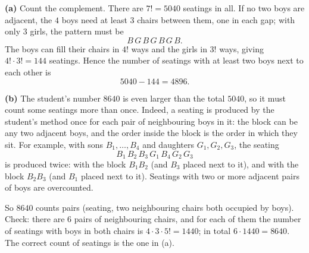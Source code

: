 \textbf{(a)} Count the complement. There are $7!=5040$ seatings in all. If no two boys are adjacent, the $4$ boys need at least $3$ chairs between them, one in each gap; with only $3$ girls, the pattern must be
\[B\,G\,B\,G\,B\,G\,B.\]
The boys can fill their chairs in $4!$ ways and the girls in $3!$ ways, giving $4!\cdot3!=144$ seatings. Hence the number of seatings with at least two boys next to each other is
\[5040-144=\boxed{4896}.\]

\textbf{(b)} The student's number $8640$ is even larger than the total $5040$, so it must count some seatings more than once. Indeed, a seating is produced by the student's method once for each pair of neighbouring boys in it: the block can be any two adjacent boys, and the order inside the block is the order in which they sit. For example, with sons $B_1,\dots,B_4$ and daughters $G_1,G_2,G_3$, the seating
\[B_1\,B_2\,B_3\,G_1\,B_4\,G_2\,G_3\]
is produced twice: with the block $B_1B_2$ (and $B_3$ placed next to it), and with the block $B_2B_3$ (and $B_1$ placed next to it). Seatings with two or more adjacent pairs of boys are overcounted.

So $8640$ counts pairs (seating, two neighbouring chairs both occupied by boys). Check: there are $6$ pairs of neighbouring chairs, and for each of them the number of seatings with boys in both chairs is $4\cdot3\cdot5!=1440$; in total $6\cdot1440=8640$. The correct count of seatings is the one in (a).
